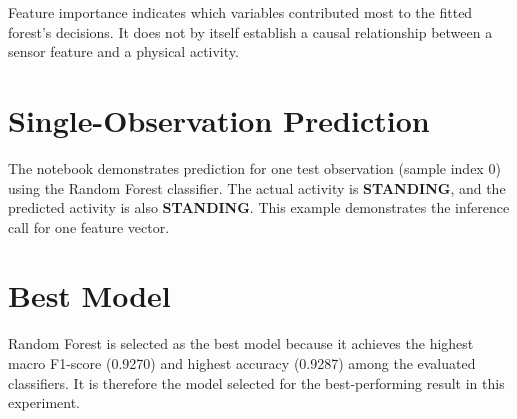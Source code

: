 Feature importance indicates which variables contributed most to the fitted forest's decisions. It does not by itself establish a causal relationship between a sensor feature and a physical activity.

\section{Single-Observation Prediction}
The notebook demonstrates prediction for one test observation (sample index 0) using the Random Forest classifier. The actual activity is \textbf{STANDING}, and the predicted activity is also \textbf{STANDING}. This example demonstrates the inference call for one feature vector.

\section{Best Model}
Random Forest is selected as the best model because it achieves the highest macro F1-score (0.9270) and highest accuracy (0.9287) among the evaluated classifiers. It is therefore the model selected for the best-performing result in this experiment.

